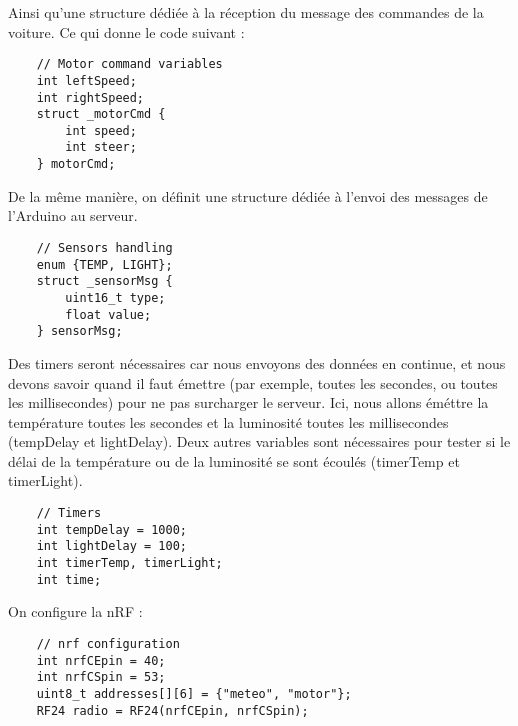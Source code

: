 Ainsi qu'une structure dédiée à la réception du message des commandes
de la voiture. Ce qui donne le code suivant :

\bigbreak
\begin{DDbox}{\linewidth}
\begin{lstlisting}
	// Motor command variables
	int leftSpeed;
	int rightSpeed;
	struct _motorCmd {
		int speed;
		int steer;
	} motorCmd;

\end{lstlisting}
\end{DDbox}

De la même manière, on définit une structure dédiée à l'envoi des messages
de l'Arduino au serveur.

\bigbreak
\begin{DDbox}{\linewidth}
\begin{lstlisting}
	// Sensors handling
	enum {TEMP, LIGHT};
	struct _sensorMsg {
		uint16_t type;
		float value;
	} sensorMsg;

\end{lstlisting}
\end{DDbox}

Des timers seront nécessaires car nous envoyons des données en continue, et nous devons
savoir quand il faut émettre (par exemple, toutes les secondes, ou toutes les millisecondes)
pour ne pas surcharger le serveur. Ici, nous allons éméttre la température toutes les secondes
et la luminosité toutes les millisecondes (tempDelay et lightDelay). 
Deux autres variables sont nécessaires pour tester si le délai de la température ou de la
luminosité se sont écoulés (timerTemp et timerLight).

\bigbreak
\begin{DDbox}{\linewidth}
\begin{lstlisting}
	// Timers
	int tempDelay = 1000;
	int lightDelay = 100;
	int timerTemp, timerLight;
	int time;

\end{lstlisting}
\end{DDbox}

On configure la nRF :

\bigbreak
\begin{DDbox}{\linewidth}
\begin{lstlisting}
	// nrf configuration
	int nrfCEpin = 40;
	int nrfCSpin = 53;
	uint8_t addresses[][6] = {"meteo", "motor"};
	RF24 radio = RF24(nrfCEpin, nrfCSpin);

\end{lstlisting}
\end{DDbox}


